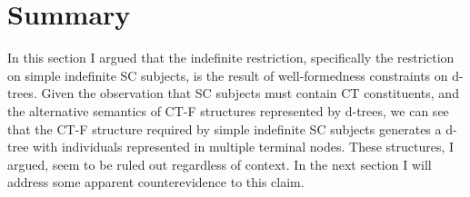 \documentclass[GPFinal]{subfiles}
\begin{document}
\section{Summary}
In this section I argued that the indefinite restriction, specifically the restriction on simple indefinite SC subjects, is the result of well-formedness constraints on d-trees.
Given the observation that SC subjects must contain CT constituents, and the alternative semantics of CT-F structures represented by  d-trees, we can see that the CT-F structure required by simple indefinite SC subjects generates a d-tree with individuals represented in multiple terminal nodes.
These structures, I argued, seem to be ruled out regardless of context.
In the next section I will address some apparent counterevidence to this claim.
\end{document}

